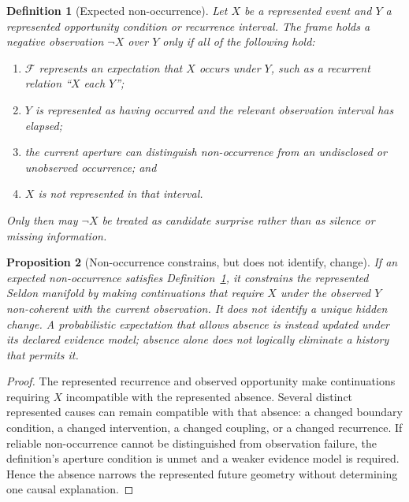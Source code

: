 \documentclass[11pt,a4paper]{article}
\newtheorem{definition}{Definition}[section]
\newtheorem{proposition}[definition]{Proposition}
\theoremstyle{remark}
\newcommand{\Frame}{\mathcal F}
\begin{document}
\begin{definition}[Expected non-occurrence]\label{def:nonoccurrence}
Let \(X\) be a represented event and \(Y\) a represented opportunity condition
or recurrence interval. The frame holds a negative observation \(\neg X\) over
\(Y\) only if all of the following hold:
\begin{enumerate}[label=(\roman*)]
\item \(\Frame\) represents an expectation that \(X\) occurs under \(Y\), such
      as a recurrent relation ``\(X\) each \(Y\)'';
\item \(Y\) is represented as having occurred and the relevant observation
      interval has elapsed;
\item the current aperture can distinguish non-occurrence from an undisclosed
      or unobserved occurrence; and
\item \(X\) is not represented in that interval.
\end{enumerate}
Only then may \(\neg X\) be treated as candidate surprise rather than as
silence or missing information.
\end{definition}

\begin{proposition}[Non-occurrence constrains, but does not identify, change]\label{prop:nonoccurrence}
If an expected non-occurrence satisfies Definition~\ref{def:nonoccurrence}, it
constrains the represented Seldon manifold by making continuations that require
\(X\) under the observed \(Y\) non-coherent with the current observation. It
does not identify a unique hidden change. A probabilistic expectation that
allows absence is instead updated under its declared evidence model; absence
alone does not logically eliminate a history that permits it.
\end{proposition}

\begin{proof}
The represented recurrence and observed opportunity make continuations requiring
\(X\) incompatible with the represented absence. Several distinct represented
causes can remain compatible with that absence: a changed boundary condition, a
changed intervention, a changed coupling, or a changed recurrence. If reliable
non-occurrence cannot be distinguished from observation failure, the
definition's aperture condition is unmet and a weaker evidence model is
required. Hence the absence narrows the
represented future geometry without determining one causal explanation.
\end{proof}
\end{document}
